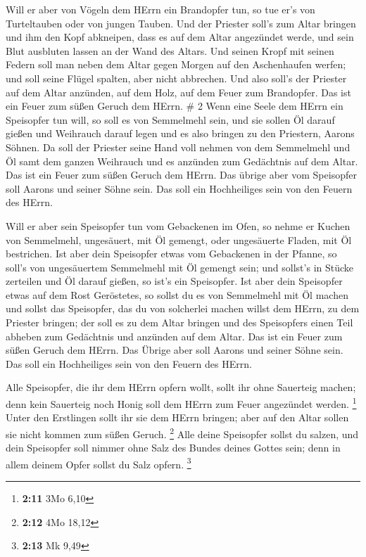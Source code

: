  Will er aber von Vögeln dem HErrn ein Brandopfer tun, so
tue er's von Turteltauben oder von jungen Tauben.  Und der
Priester soll's zum Altar bringen und ihm den Kopf abkneipen, dass es
auf dem Altar angezündet werde, und sein Blut ausbluten lassen an der
Wand des Altars.  Und seinen Kropf mit seinen Federn soll
man neben dem Altar gegen Morgen auf den Aschenhaufen werfen;
 und soll seine Flügel spalten, aber nicht abbrechen. Und
also soll's der Priester auf dem Altar anzünden, auf dem Holz, auf dem
Feuer zum Brandopfer. Das ist ein Feuer zum süßen Geruch dem HErrn. \# 2
 Wenn eine Seele dem HErrn ein Speisopfer tun will, so soll
es von Semmelmehl sein, und sie sollen Öl darauf gießen und Weihrauch
darauf legen  und es also bringen zu den Priestern, Aarons
Söhnen. Da soll der Priester seine Hand voll nehmen von dem Semmelmehl
und Öl samt dem ganzen Weihrauch und es anzünden zum Gedächtnis auf dem
Altar. Das ist ein Feuer zum süßen Geruch dem HErrn.  Das
übrige aber vom Speisopfer soll Aarons und seiner Söhne sein. Das soll
ein Hochheiliges sein von den Feuern des HErrn.

 Will er aber sein Speisopfer tun vom Gebackenen im Ofen, so
nehme er Kuchen von Semmelmehl, ungesäuert, mit Öl gemengt, oder
ungesäuerte Fladen, mit Öl bestrichen.  Ist aber dein
Speisopfer etwas vom Gebackenen in der Pfanne, so soll's von
ungesäuertem Semmelmehl mit Öl gemengt sein;  und sollst's
in Stücke zerteilen und Öl darauf gießen, so ist's ein Speisopfer.
 Ist aber dein Speisopfer etwas auf dem Rost Geröstetes, so
sollst du es von Semmelmehl mit Öl machen  und sollst das
Speisopfer, das du von solcherlei machen willst dem HErrn, zu dem
Priester bringen; der soll es zu dem Altar bringen  und des
Speisopfers einen Teil abheben zum Gedächtnis und anzünden auf dem
Altar. Das ist ein Feuer zum süßen Geruch dem HErrn.  Das
Übrige aber soll Aarons und seiner Söhne sein. Das soll ein Hochheiliges
sein von den Feuern des HErrn.

 Alle Speisopfer, die ihr dem HErrn opfern wollt, sollt ihr
ohne Sauerteig machen; denn kein Sauerteig noch Honig soll dem HErrn zum
Feuer angezündet werden. \footnote{\textbf{2:11} 3Mo 6,10} 
Unter den Erstlingen sollt ihr sie dem HErrn bringen; aber auf den Altar
sollen sie nicht kommen zum süßen Geruch. \footnote{\textbf{2:12} 4Mo
  18,12}  Alle deine Speisopfer sollst du salzen, und dein
Speisopfer soll nimmer ohne Salz des Bundes deines Gottes sein; denn in
allem deinem Opfer sollst du Salz opfern. \footnote{\textbf{2:13} Mk
  9,49}

